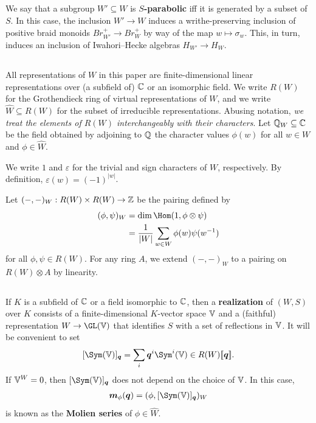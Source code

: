 \documentclass[a4paper,10pt,leqno]{amsart}
\theoremstyle{plain}
\theoremstyle{plain}
\theoremstyle{plain}
\theoremstyle{definition}
\theoremstyle{remark}
\newcommand{\dfemph}[1]{\textbf{#1}}
\newcommand{\Br}{\mathit{Br}}
\newcommand{\Q}{\bm{q}}
\begin{document}
\subsection{}\label{subsec:parabolic}

We say that a subgroup $W' \subseteq W$ is \dfemph{$S$-parabolic} iff it is generated by a subset of $S$.
In this case, the inclusion $W' \to W$ induces a writhe-preserving inclusion of positive braid monoids $\Br_{W'}^+ \to \Br_W^+$ by way of the map $w \mapsto \sigma_w$.
This, in turn, induces an inclusion of Iwahori--Hecke algebras $H_{W'} \to H_W$.

\subsection{}\label{subsec:representation}

All representations of $W$ in this paper are finite-dimensional linear representations over (a subfield of) $\mathbb{C}$ or an isomorphic field.
We write $R(W)$ for the Grothendieck ring of virtual representations of $W$, and we write $\hat{W} \subseteq R(W)$ for the subset of irreducible representations.
Abusing notation, \emph{we treat the elements of $R(W)$ interchangeably with their characters}.
Let $\mathbb{Q}_W \subseteq \mathbb{C}$ be the field obtained by adjoining to $\mathbb{Q}$ the character values $\phi(w)$ for all $w \in W$ and $\phi \in \hat{W}$.

We write $1$ and $\varepsilon$ for the trivial and sign characters of $W$, respectively.
By definition, $\varepsilon(w) = (-1)^{|w|}$.

Let $(-, -)_W : R(W) \times R(W) \to \mathbb{Z}$ be the pairing defined by
\begin{align}\begin{split}
(\phi, \psi)_W 
&= \dim \Hom(1, \phi \otimes \psi)\\
&= \frac{1}{|W|}
\sum_{w \in W} \phi(w)\psi(w^{-1})
\end{split}\end{align}
for all $\phi, \psi \in R(W)$.
For any ring $A$, we extend $(-, -)_W$ to a pairing on $R(W) \otimes A$ by linearity.

\subsection{}\label{subsec:realization}

If $K$ is a subfield of $\mathbb{C}$ or a field isomorphic to $\mathbb{C}$, then a \dfemph{realization} of $(W, S)$ over $K$ consists of a finite-dimensional $K$-vector space $\mathbb{V}$ and a (faithful) representation $W \to \GL(\bb{V})$ that identifies $S$ with a set of reflections in $\mathbb{V}$.
It will be convenient to set
\begin{align}
{[\Sym(\bb{V})]_{\Q}} = \sum_i {\Q^i} \Sym^i(\bb{V}) \in R(W)[\![\Q]\!].
\end{align}
If $\mathbb{V}^W = 0$, then $[\Sym(\bb{V})]_{\Q}$ does not depend on the choice of $\mathbb{V}$.
In this case,
\begin{align}
\bm{m}_\phi(\Q) = (\phi, [\Sym(\bb{V})]_{\Q})_W
\end{align}
is known as the \dfemph{Molien series} of $\phi \in \hat{W}$.
\end{document}

